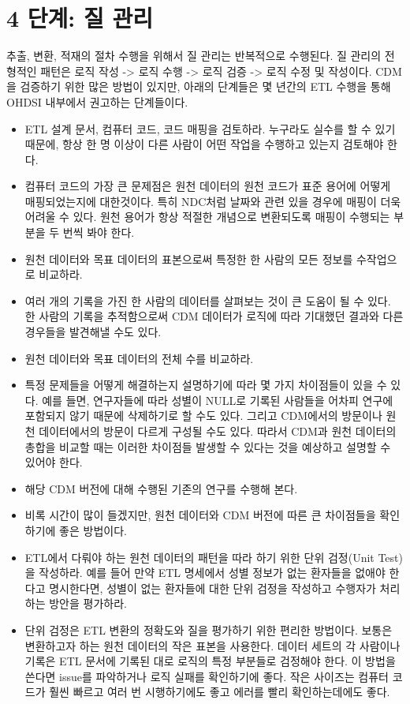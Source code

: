 \documentclass[11pt]{book}
\providecommand{\tightlist}{%
  \setlength{\itemsep}{0pt}\setlength{\parskip}{0pt}}
\theoremstyle{definition}
\theoremstyle{definition}
\theoremstyle{definition}
\theoremstyle{remark}
\begin{document}
\section{4 단계: 질 관리}\label{--}

추출, 변환, 적재의 절차 수행을 위해서 질 관리는 반복적으로 수행된다. 질
관리의 전형적인 패턴은 로직 작성 -\textgreater{} 로직 수행
-\textgreater{} 로직 검증 -\textgreater{} 로직 수정 및 작성이다. CDM을
검증하기 위한 많은 방법이 있지만, 아래의 단계들은 몇 년간의 ETL 수행을
통해 OHDSI 내부에서 권고하는 단계들이다. 

\begin{itemize}
\tightlist
\item
  ETL 설계 문서, 컴퓨터 코드, 코드 매핑을 검토하라. 누구라도 실수를 할
  수 있기 때문에, 항상 한 명 이상이 다른 사람이 어떤 작업을 수행하고
  있는지 검토해야 한다.
\item
  컴퓨터 코드의 가장 큰 문제점은 원천 데이터의 원천 코드가 표준 용어에
  어떻게 매핑되었는지에 대한것이다. 특히 NDC처럼 날짜와 관련 있을 경우에
  매핑이 더욱 어려울 수 있다. 원천 용어가 항상 적절한 개념으로
  변환되도록 매핑이 수행되는 부분을 두 번씩 봐야 한다.
\item
  원천 데이터와 목표 데이터의 표본으로써 특정한 한 사람의 모든 정보를
  수작업으로 비교하라.
\item
  여러 개의 기록을 가진 한 사람의 데이터를 살펴보는 것이 큰 도움이 될 수
  있다. 한 사람의 기록을 추적함으로써 CDM 데이터가 로직에 따라 기대했던
  결과와 다른 경우들을 발견해낼 수도 있다.
\item
  원천 데이터와 목표 데이터의 전체 수를 비교하라.
\item
  특정 문제들을 어떻게 해결하는지 설명하기에 따라 몇 가지 차이점들이
  있을 수 있다. 예를 들면, 연구자들에 따라 성별이 NULL로 기록된 사람들을
  어차피 연구에 포함되지 않기 때문에 삭제하기로 할 수도 있다. 그리고
  CDM에서의 방문이나 원천 데이터에서의 방문이 다르게 구성될 수도 있다.
  따라서 CDM과 원천 데이터의 총합을 비교할 때는 이러한 차이점들 발생할
  수 있다는 것을 예상하고 설명할 수 있어야 한다.
\item
  해당 CDM 버전에 대해 수행된 기존의 연구를 수행해 본다.
\item
  비록 시간이 많이 들겠지만, 원천 데이터와 CDM 버전에 따른 큰 차이점들을
  확인하기에 좋은 방법이다.
\item
  ETL에서 다뤄야 하는 원천 데이터의 패턴을 따라 하기 위한 단위 검정(Unit
  Test)을 작성하라. 예를 들어 만약 ETL 명세에서 성별 정보가 없는
  환자들을 없애야 한다고 명시한다면, 성별이 없는 환자들에 대한 단위
  검정을 작성하고 수행자가 처리하는 방안을 평가하라.
\item
  단위 검정은 ETL 변환의 정확도와 질을 평가하기 위한 편리한 방법이다.
  보통은 변환하고자 하는 원천 데이터의 작은 표본을 사용한다. 데이터
  세트의 각 사람이나 기록은 ETL 문서에 기록된 대로 로직의 특정 부분들로
  검정해야 한다. 이 방법을 쓴다면 issue를 파악하거나 로직 실패를
  확인하기에 좋다. 작은 사이즈는 컴퓨터 코드가 훨씬 빠르고 여러 번
  시행하기에도 좋고 에러를 빨리 확인하는데에도 좋다.
\end{itemize}
\end{document}
